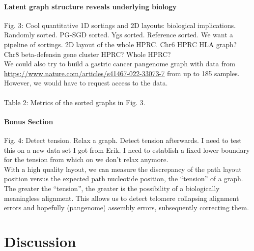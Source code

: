 \documentclass{bioinfo}
\theoremstyle{definition}
\begin{document}
    \paragraph{Latent graph structure reveals underlying biology}
    Fig. 3: Cool quantitative 1D sortings and 2D layouts: biological implications.
    Randomly sorted. PG-SGD sorted. Ygs sorted. Reference sorted.
    We want a pipeline of sortings. 2D layout of the whole HPRC.
    Chr6 HPRC HLA graph? Chr8 beta-defensin gene cluster HPRC? Whole HPRC?
    \\
    We could also try to build a gastric cancer pangenome graph with data from \url{https://www.nature.com/articles/s41467-022-33073-7} from up to 185 samples.
    However, we would have to request access to the data.
    \\
    \\
    
    Table 2: Metrics of the sorted graphs in Fig. 3.
    

    \paragraph{Bonus Section}
    Fig. 4: Detect tension. Relax a graph. Detect tension afterwards.
    I need to test this on a new data set I got from Erik.
    I need to establish a fixed lower boundary for the tension from which on we don't relax anymore. \\
    With a high quality layout, we can measure the discrepancy of the path layout position versus the expected path nucleotide position, the “tension” of a graph.
    The greater the “tension”, the greater is the possibility of a biologically meaningless alignment.
    This allows us to detect telomere collapsing alignment errors and hopefully (pangenome) assembly errors, subsequently correcting them.
    
    \fi


    \section{Discussion}
    \label{sec:discussion}
\end{document}
